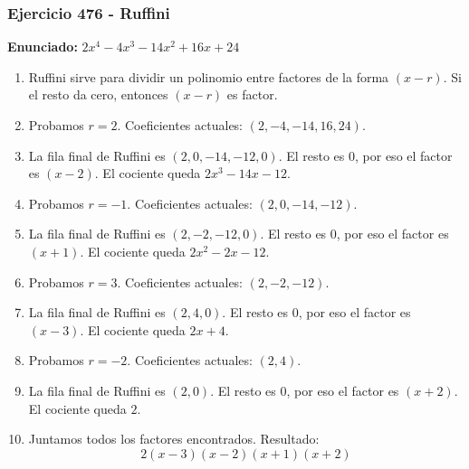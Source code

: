 \documentclass[11pt,a4paper]{article}
\begin{document}
\subsubsection*{Ejercicio 476 - Ruffini}
\textbf{Enunciado:} $ 2 x^{4} - 4 x^{3} - 14 x^{2} + 16 x + 24 $\par
\begin{enumerate}[leftmargin=2em]
\item Ruffini sirve para dividir un polinomio entre factores de la forma \((x-r)\). Si el resto da cero, entonces \((x-r)\) es factor.
\item Probamos \(r=2\). Coeficientes actuales: \((2, -4, -14, 16, 24)\).
\item La fila final de Ruffini es \((2, 0, -14, -12, 0)\). El resto es \(0\), por eso el factor es \((x-2)\). El cociente queda \(2 x^{3} - 14 x - 12\).
\item Probamos \(r=-1\). Coeficientes actuales: \((2, 0, -14, -12)\).
\item La fila final de Ruffini es \((2, -2, -12, 0)\). El resto es \(0\), por eso el factor es \((x+1)\). El cociente queda \(2 x^{2} - 2 x - 12\).
\item Probamos \(r=3\). Coeficientes actuales: \((2, -2, -12)\).
\item La fila final de Ruffini es \((2, 4, 0)\). El resto es \(0\), por eso el factor es \((x-3)\). El cociente queda \(2 x + 4\).
\item Probamos \(r=-2\). Coeficientes actuales: \((2, 4)\).
\item La fila final de Ruffini es \((2, 0)\). El resto es \(0\), por eso el factor es \((x+2)\). El cociente queda \(2\).
\item Juntamos todos los factores encontrados. Resultado: \[\boxed{2 \left(x - 3\right) \left(x - 2\right) \left(x + 1\right) \left(x + 2\right)}\]
\end{enumerate}

\vspace{0.2cm}
\end{document}
